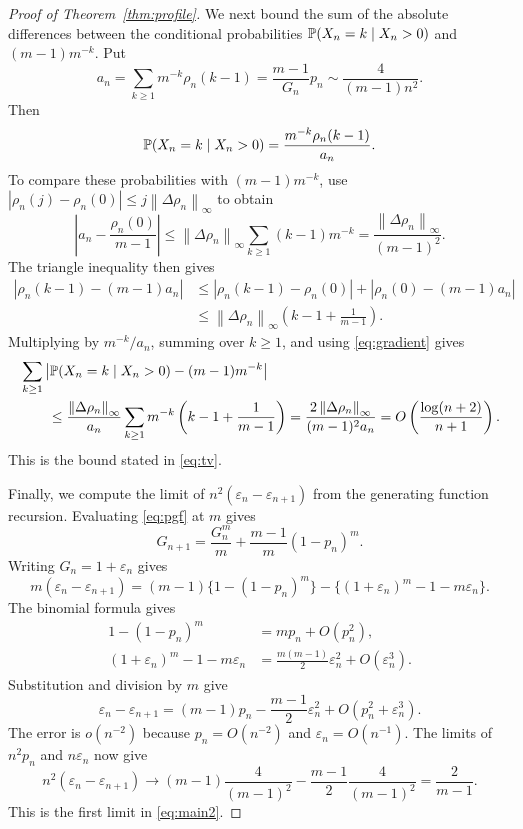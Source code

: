 \documentclass[11pt,letterpaper,reqno]{amsart}
\numberwithin{equation}{section}
\theoremstyle{plain}
\theoremstyle{remark}
\newcommand{\norm}[1]{\left\lVert#1\right\rVert}
\begin{document}
\begin{proof}[Proof of Theorem~\ref{thm:profile}]
We next bound the sum of the absolute differences between the conditional probabilities $\mathbb P(X_n=k\mid X_n>0)$ and $(m-1)m^{-k}$. Put
\[
 a_n=\sum_{k\ge1}m^{-k}\rho_n(k-1)
     =\frac{m-1}{G_n}p_n
     \sim\frac4{(m-1)n^2}.
\]
Then
\[
 \mathbb P(X_n=k\mid X_n>0)
 =\frac{m^{-k}\rho_n(k-1)}{a_n}.
\]
To compare these probabilities with $(m-1)m^{-k}$, use $|\rho_n(j)-\rho_n(0)|\le j\norm{\Delta\rho_n}_\infty$ to obtain
\[
 \left|a_n-\frac{\rho_n(0)}{m-1}\right|
 \le \norm{\Delta\rho_n}_\infty\sum_{k\ge1}(k-1)m^{-k}
 =\frac{\norm{\Delta\rho_n}_\infty}{(m-1)^2}.
\]
The triangle inequality then gives
\[
 \begin{split}
 |\rho_n(k-1)-(m-1)a_n|
 &\le|\rho_n(k-1)-\rho_n(0)|
       +|\rho_n(0)-(m-1)a_n|\\
 &\le \norm{\Delta\rho_n}_\infty\left(k-1+\frac1{m-1}\right).
 \end{split}
\]
Multiplying by $m^{-k}/a_n$, summing over $k\ge1$, and using \eqref{eq:gradient} gives
\[
 \begin{split}
 &\sum_{k\ge1}
   \left|\Pp(X_n=k\mid X_n>0)-(m-1)m^{-k}\right|\\
 &\qquad\le\frac{\norm{\Delta\rho_n}_\infty}{a_n}
       \sum_{k\ge1}m^{-k}\left(k-1+\frac1{m-1}\right)
  =\frac{2\norm{\Delta\rho_n}_\infty}{(m-1)^2a_n}
  =O\left(\frac{\log(n+2)}{n+1}\right).
  \end{split}
\]
This is the bound stated in \eqref{eq:tv}.

Finally, we compute the limit of $n^2(\varepsilon_n-\varepsilon_{n+1})$ from the generating function recursion. Evaluating \eqref{eq:pgf} at $m$ gives
\[
 G_{n+1}=\frac{G_n^m}{m}+\frac{m-1}{m}(1-p_n)^m.
\]
Writing $G_n=1+\varepsilon_n$ gives
\[
 m(\varepsilon_n-\varepsilon_{n+1})
 =(m-1)\{1-(1-p_n)^m\}-\{(1+\varepsilon_n)^m-1-m\varepsilon_n\}.
\]
The binomial formula gives
\[
 \begin{split}
 1-(1-p_n)^m&=mp_n+O(p_n^2),\\
 (1+\varepsilon_n)^m-1-m\varepsilon_n
 &=\frac{m(m-1)}2\varepsilon_n^2+O(\varepsilon_n^3).
 \end{split}
\]
Substitution and division by $m$ give
\[
 \varepsilon_n-\varepsilon_{n+1}
 =(m-1)p_n-\frac{m-1}{2}\varepsilon_n^2
   +O(p_n^2+\varepsilon_n^3).
\]
The error is $o(n^{-2})$ because $p_n=O(n^{-2})$ and $\varepsilon_n=O(n^{-1})$. The limits of $n^2p_n$ and $n\varepsilon_n$ now give
\[
 n^2(\varepsilon_n-\varepsilon_{n+1})\longrightarrow
 (m-1)\frac4{(m-1)^2}-\frac{m-1}{2}\frac4{(m-1)^2}
 =\frac2{m-1}.
\]
This is the first limit in \eqref{eq:main2}.
\end{proof}
\end{document}
